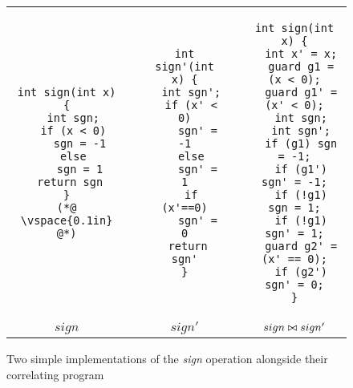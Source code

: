\begin{figure}
\centering
\begin{tabular}{ccccc}
\begin{lstlisting}
int sign(int x) {
  int sgn;
  if (x < 0)
    sgn = -1
  else
    sgn = 1
 return sgn
}
(*@ \vspace{0.1in} @*)
\end{lstlisting}
&
\hspace{0.35in}
&
\begin{lstlisting}
int sign'(int x) {
  int sgn';
  if (x' < 0)
    sgn' = -1
  else
    sgn' = 1
  if (x'==0)
    sgn' = 0
 return sgn'
}
\end{lstlisting}
&
\hspace{0.35in}
&
\begin{lstlisting}
int sign(int x) {
  int x' = x;
  guard g1 = (x < 0);
  guard g1' = (x' < 0);
  int sgn;
  int sgn';
  if (g1) sgn = -1;
  if (g1') sgn' = -1;
  if (!g1) sgn = 1;
  if (!g1) sgn' = 1;
  guard g2' = (x' == 0);
  if (g2') sgn' = 0;
}
\end{lstlisting}
\\ 
$sign$
&
&
$sign'$
&
&
$sign \bowtie sign'$
\end{tabular}
\caption{Two simple implementations of the \emph{sign} operation alongside their correlating program}
\end{figure}
